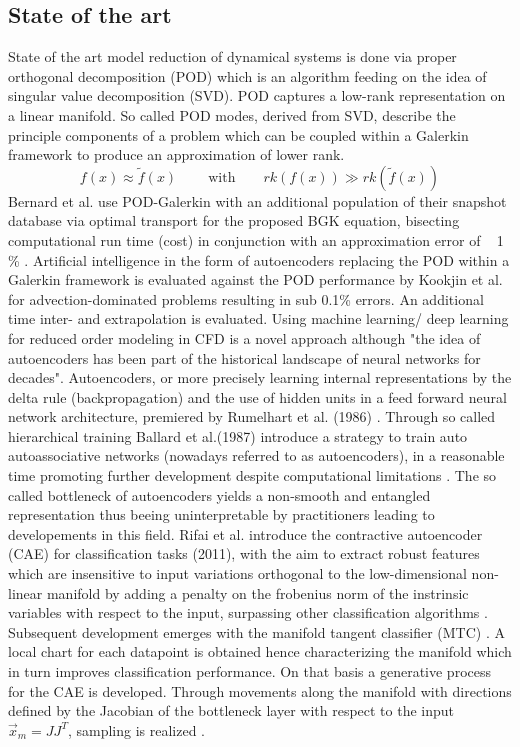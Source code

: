 \documentclass[12pt, a4paper]{article}
\begin{document}
\subsection{State of the art}
State of the art model reduction of dynamical systems is done via proper orthogonal decomposition (POD) which is an algorithm feeding on the idea of singular value decomposition (SVD)\cite{Franz}\cite{Kutz}. POD captures a low-rank representation on a linear manifold. So called POD modes, derived from SVD, describe the principle components of a problem which can be coupled within a Galerkin framework to produce an approximation of lower rank. 
\begin{equation}
	f(x)\approx \tilde{f}(x) \qquad\ \textrm{with}\qquad rk(f(x)) \gg rk(\tilde{f}(x))
\end{equation}
Bernard et al. use POD-Galerkin with an additional population of their snapshot database via optimal transport for the proposed BGK equation, bisecting computational run time (cost) in conjunction with an approximation error of ~ 1 \% \cite{Bernard}. Artificial intelligence in the form of autoencoders replacing the POD within a Galerkin framework is evaluated against the POD performance by Kookjin et al. for advection-dominated problems\cite{Carlberg} resulting in sub 0.1\% errors. An additional time inter- and extrapolation is evaluated. Using machine learning/ deep learning for reduced order modeling in CFD is a novel approach although "the idea of autoencoders has been part of the historical landscape of neural networks for decades"\cite[p.493]{Goodfellow}. Autoencoders, or more precisely learning internal representations by the delta rule (backpropagation) and the use of hidden units in a feed forward neural network architecture, premiered by Rumelhart et al. (1986) \cite{Rumelhart}.  Through so called hierarchical training Ballard et al.(1987) introduce a strategy to train auto autoassociative networks (nowadays referred to as autoencoders), in a reasonable time promoting further development despite computational limitations \cite{Ballard}. The so called bottleneck of autoencoders yields a non-smooth and entangled representation thus beeing uninterpretable by practitioners\cite{Rifai2011} leading to developements in this field. Rifai et al. introduce the contractive autoencoder (CAE) for classification tasks (2011), with the aim to extract robust features which are insensitive to input variations orthogonal to the low-dimensional non-linear manifold by adding a penalty on the frobenius norm of the instrinsic variables with respect to the input, surpassing other classification algorithms \cite{Rifai2011}. Subsequent development emerges with the manifold tangent classifier (MTC) \cite{Rifai_2011a}. A local chart for each datapoint is obtained hence characterizing the manifold  which in turn improves classification performance. On that basis a generative process for the CAE is developed. Through movements along the manifold with directions defined by the Jacobian of the bottleneck layer with respect to the input \begin{math}	\vec{x}_m=JJ^T \end{math}, sampling is realized \cite{rifai2012generative}. 
\end{document}

